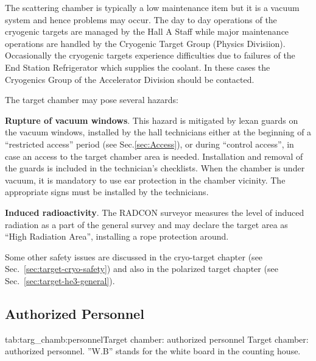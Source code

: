 The scattering chamber is typically a low maintenance item but it is a vacuum
system and hence problems may occur. The day to day operations of the cryogenic
targets are managed by the Hall A Staff while major maintenance operations are
handled by the Cryogenic Target Group (Physics Divisiion). Occasionally the
cryogenic targets experience difficulties due to failures of the End Station
Refrigerator which supplies the coolant. In these cases the Cryogenics Group
of the Accelerator Division should be contacted.

\noindent{}The target chamber may pose several hazards:

\begin{list}{.~}{\setlength{\itemsep}{-0.15cm}}
  \item {\bf Rupture of vacuum windows}. This hazard is mitigated by
        lexan guards on the vacuum windows, installed by the hall technicians
        either at the beginning of a ``restricted access'' period (see Sec.\ref{sec:Access}),
        or during ``control access'', in case an access to the target chamber area is needed.
        Installation and removal of the guards is included in the technician's checklists.
        When the chamber is under vacuum, it is mandatory to use ear protection in the chamber
        vicinity. The appropriate signs must be installed by the technicians. 

  \item {\bf Induced radioactivity}. The RADCON surveyor measures the level of induced
        radiation as a part of the general survey and may declare the target area 
        as ``High Radiation Area'', installing a rope protection around\cite{RWIcebaf}. 

\end{list}

Some other safety issues are discussed in the cryo-target chapter 
(see Sec.~\ref{sec:target-cryo-safety}) and also in the polarized target
chapter (see Sec.~\ref{sec:target-he3-general}).

\begin{safetyen}{10}{15}
\section[Authorized  Personnel]{Authorized  Personnel}
\end{safetyen}

\begin{namestab}{tab:targ_chamb:personnel}{Target chamber: authorized personnel}{%
      Target chamber: authorized personnel. ''W.B'' stands for the white board 
      in the counting house.}
  \EdFolts{}
  \JianPingChen{}
\end{namestab}

